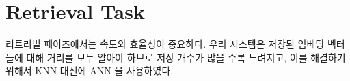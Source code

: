 \section{Retrieval Task}
리트리벌 페이즈에서는 속도와 효율성이 중요하다. 우리 시스템은 저장된 임베딩 벡터들에 대해 거리를 모두 알아야 하므로 저장 개수가 많을 수록 느려지고, 이를 해결하기 위해서 KNN 대신에 ANN 을 사용하였다.  %
